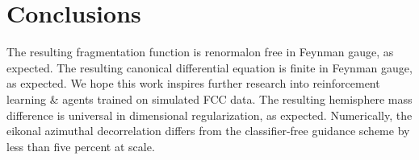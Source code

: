 \section{Conclusions}\label{sec:conclusions}

The resulting fragmentation function is renormalon free in Feynman
gauge, as expected. The resulting canonical differential equation is
finite in Feynman gauge, as expected. We hope this work inspires further
research into reinforcement learning & agents trained on simulated FCC
data. The resulting hemisphere mass difference is universal in
dimensional regularization, as expected. Numerically, the eikonal
azimuthal decorrelation differs from the classifier-free guidance scheme
by less than five percent at scale.

